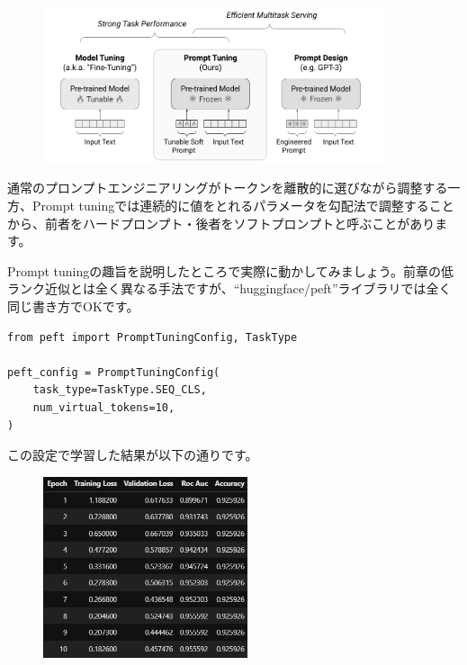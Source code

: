 \documentclass[a5paper,twoside,dvipdfmx]{jsarticle}
\begin{document}
\begin{figure}[h]
  \centering
  \includegraphics[width=100mm]{../C105Fig/gray/prompttuning_image.png}
 \end{figure} 

 

通常のプロンプトエンジニアリングがトークンを離散的に選びながら調整する一方、Prompt tuningでは連続的に値をとれるパラメータを勾配法で調整することから、前者をハードプロンプト・後者をソフトプロンプトと呼ぶことがあります。

Prompt tuningの趣旨を説明したところで実際に動かしてみましょう。前章の低ランク近似とは全く異なる手法ですが、``huggingface/peft''ライブラリでは全く同じ書き方でOKです。

\begin{lstlisting}
from peft import PromptTuningConfig, TaskType

peft_config = PromptTuningConfig(
    task_type=TaskType.SEQ_CLS,
    num_virtual_tokens=10,
)
\end{lstlisting}

この設定で学習した結果が以下の通りです。


\begin{figure}[h]
  \centering
  \includegraphics[width=60mm]{../C105Fig/gray/prompttuning_train.png}
 \end{figure} 
\end{document}

